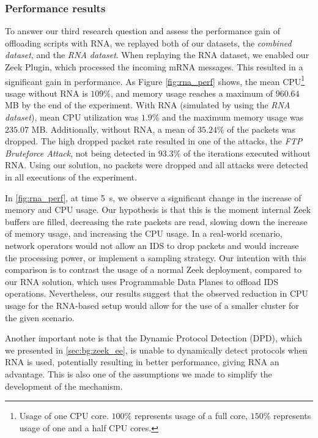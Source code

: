 \subsubsection*{Performance results}

To answer our third research question and assess the performance gain of offloading scripts with RNA, we replayed both of our datasets, the \textit{combined dataset}, and the \textit{RNA dataset}. When replaying the RNA dataset, we enabled our Zeek Plugin, which processed the incoming mRNA messages. This resulted in a significant gain in performance. As Figure \ref{fig:rna_perf} shows, the mean CPU\footnote{Usage of one CPU core. $100\%$ represents usage of a full core, $150\%$ represents usage of one and a half CPU cores.} usage without RNA is $109\%$, and memory usage reaches a maximum of $960.64$ MB by the end of the experiment. With RNA (simulated by using the \textit{RNA dataset}), mean CPU utilization was $1.9\%$ and the maximum memory usage was $235.07$ MB. Additionally, without RNA, a mean of $35.24\%$ of the packets was dropped. The high dropped packet rate resulted in one of the attacks, the \textit{FTP Bruteforce Attack}, not being detected in $93.3\%$ of the iterations executed without RNA. Using our solution, no packets were dropped and all attacks were detected in all executions of the experiment.

In \autoref{fig:rna_perf}, at time \SI{5}{s}, we observe a significant change in the increase of memory and CPU usage. Our hypothesis is that this is the moment internal Zeek buffers are filled, decreasing the rate packets are read, slowing down the increase of memory usage, and increasing the CPU usage. In a real-world scenario, network operators would not allow an IDS to drop packets and would increase the processing power, or implement a sampling strategy. Our intention with this comparison is to contrast the usage of a normal Zeek deployment, compared to our RNA solution, which uses Programmable Data Planes to offload IDS operations. Nevertheless, our results suggest that the observed reduction in CPU usage for the RNA-based setup would allow for the use of a smaller cluster for the given scenario. 

Another important note is that the Dynamic Protocol Detection (DPD), which we presented in \autoref{sec:bg:zeek_ee}, is unable to dynamically detect protocols when RNA is used, potentially resulting in better performance, giving RNA an advantage. This is also one of the assumptions we made to simplify the development of the mechanism.

